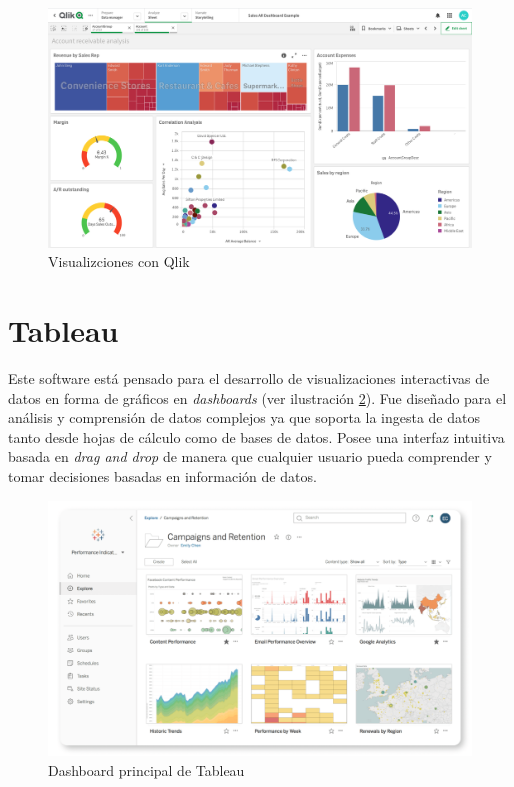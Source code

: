 \begin{figure}
    \centering
    \includegraphics[width=1\linewidth]{img/qlik.png}
    \caption{Visualizciones con Qlik \cite{Qlik} }
    \label{fig:qlik}
\end{figure}

\paragraph{            }
\paragraph{            }

\section{Tableau}
Este software está pensado para el desarrollo de visualizaciones interactivas  de datos en forma de gráficos en \textit{dashboards}  (ver ilustración  \ref{fig:tableau}). Fue diseñado para el análisis y comprensión de datos complejos ya que soporta la ingesta de datos tanto desde hojas de cálculo como de bases de datos. Posee una interfaz intuitiva basada en \textit{drag and drop} de manera que cualquier usuario pueda comprender y tomar decisiones basadas en información de datos.

\begin{figure}
    \centering
    \includegraphics[width=1\linewidth]{img/tableau.png}
    \caption{Dashboard principal de Tableau \cite{tableau}}
    \label{fig:tableau}
\end{figure}
